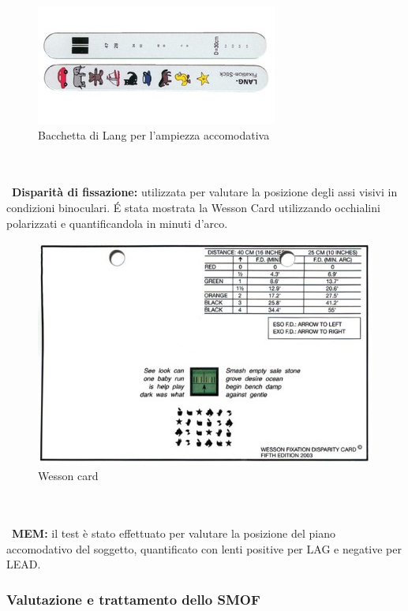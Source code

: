 \begin{figure}[h!]
	\centering
	\includegraphics[scale=0.5]{source/immagini/ampiezza_accomodativa.jpg}
	\caption[Semantic Web stack]{Bacchetta di Lang per l'ampiezza accomodativa}
	\label{fig:issuexample}
\end{figure}
\\\ \\\
\textbf{Disparità di fissazione:} utilizzata per valutare la posizione degli assi visivi in condizioni binoculari. É stata mostrata
la Wesson Card utilizzando occhialini polarizzati e quantificandola in minuti d’arco.

\begin{figure}[h!]
	\centering
	\includegraphics[scale=0.22]{source/immagini/Wesson_card.jpg}
	\caption[Semantic Web stack]{Wesson card}
	\label{fig:issuexample}
\end{figure}
\\\ \\\
\textbf{MEM:} il test è stato effettuato per valutare la posizione del piano accomodativo del soggetto, quantificato con lenti
positive per LAG e negative per LEAD.

\subsubsection{Valutazione e trattamento dello SMOF}

